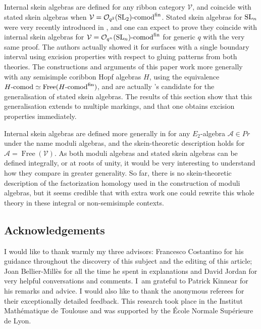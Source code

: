 \documentclass[pdftex]{sigma}%
\numberwithin{equation}{section}
\newcommand{\Free}{\operatorname{Free}}
\newcommand{\Oqcomfin}{\Oq\text{-}{\rm comod}^{\rm fin}}
\newcommand{\Oq}{\mathcal{O}_{q^2}({\rm SL}_2)}
\begin{document}
\begin{Remark}
Internal skein algebras are defined for any ribbon category $\mathcal{V}$, and coincide with stated skein algebras when $\mathcal{V} = \Oqcomfin$.
Stated skein algebras for ${\rm SL}_n$ were very recently introduced in \cite{LeSikora}, and one can expect to prove they coincide with internal skein algebras for $\mathcal{V} = \mathcal{O}_{q^n}({\rm SL}_n)\text{-}{\rm comod}^{\rm fin}$ for generic $q$ with the very same proof. The authors actually showed it for surfaces with a single boundary interval using excision properties with respect to gluing patterns from both theories. The constructions and arguments of this paper work more generally with any semisimple coribbon Hopf algebras $H$, using the equivalence $H\text{-}{\rm comod} \simeq \Free(H\text{-}{\rm comod}^{\rm fin})$, and are actually \cite{Gunningham}'s candidate for the generalisation of stated skein algebras. The results of this section show that this generalisation extends to multiple markings, and that one obtains excision properties immediately.

Internal skein algebras are defined more generally in \cite{BBJ} for any $E_2$-algebra $\mathcal{A} \in Pr$ under the name moduli algebras, and the skein-theoretic description holds for $\mathcal{A} = \Free(\mathcal{V})$. As both moduli algebras and stated skein algebras can be defined integrally, or at roots of unity, it would be very interesting to understand how they compare in greater generality. So far, there is no skein-theoretic description of the factorization homology used in the construction of moduli algebras, but it seems credible that with extra work one could rewrite this whole theory in these integral or non-semisimple contexts.
\end{Remark}

\subsection*{Acknowledgements}
I would like to thank warmly my three advisors: Francesco Costantino for his guidance throughout the discovery of this subject and the editing of this article; Joan Bellier-Mill\`es for all the time he spent in explanations and David Jordan for very helpful conversations and comments. I~am grateful to Patrick Kinnear for his remarks and advice. I would also like to thank the anonymous referees for their exceptionally detailed feedback. This research took place in the Institut Math\'ematique de Toulouse and was supported by the \'Ecole Normale Sup\'erieure de Lyon.
\end{document}
